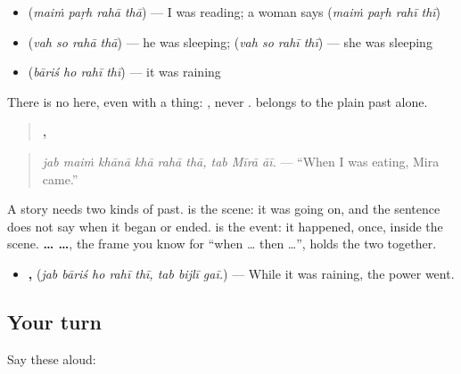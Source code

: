 \begin{itemize}
\raggedright
  \item \textbf{   } (\emph{maiṁ paṛh rahā thā}) — I was reading; a woman says \textbf{   } (\emph{maiṁ paṛh rahī thī})
  \item \textbf{   } (\emph{vah so rahā thā}) — he was sleeping; \textbf{   } (\emph{vah so rahī thī}) — she was sleeping
  \item \textbf{   } (\emph{bāriś ho rahī thī}) — it was raining
\end{itemize}

There is no \textbf{} here, even with a thing: \textbf{    }, never \textbf{}. \textbf{} belongs to the plain past alone.

\begin{grammarlens}[title={Grammar Lens: a scene and an event}]
\begin{quote}
\textbf{     ,   }
\end{quote}

\begin{quote}
\emph{jab maiṁ khānā khā rahā thā, tab Mīrā āī.} — \textquotedblleft{}When I was eating, Mira came.\textquotedblright{}
\end{quote}

A story needs two kinds of past. \textbf{  } is the scene: it was going on, and the sentence does not say when it began or ended. \textbf{} is the event: it happened, once, inside the scene. \textbf{ …  …}, the frame you know for \textquotedblleft{}when … then …\textquotedblright{}, holds the two together.

\begin{itemize}
\raggedright
  \item \textbf{    ,   } (\emph{jab bāriś ho rahī thī, tab bijlī gaī.}) — While it was raining, the power went.
\end{itemize}
\end{grammarlens}

\subsection*{Your turn}
Say these aloud:

